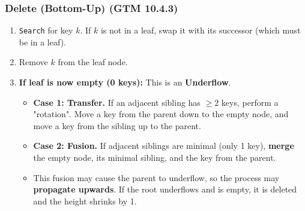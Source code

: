 \subsubsection{Delete (Bottom-Up) (GTM 10.4.3)}
\begin{enumerate}
    \item \texttt{Search} for key $k$. If $k$ is not in a leaf, swap it with its successor (which must be in a leaf).
    \item Remove $k$ from the leaf node.
    \item \textbf{If leaf is now empty (0 keys):} This is an \textbf{Underflow}.
    \begin{itemize}
        \item \textbf{Case 1: Transfer.} If an adjacent sibling has $\ge 2$ keys, perform a "rotation". Move a key from the parent down to the empty node, and move a key from the sibling up to the parent.
        \item \textbf{Case 2: Fusion.} If adjacent siblings are minimal (only 1 key), \textbf{merge} the empty node, its minimal sibling, and the key from the parent.
        \item This fusion may cause the parent to underflow, so the process may \textbf{propagate upwards}. If the root underflows and is empty, it is deleted and the height shrinks by 1.
    \end{itemize}
\end{enumerate}

